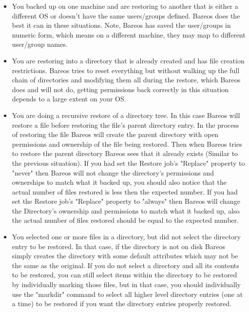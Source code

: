 \begin{itemize}
\item You backed up on one machine and are restoring to another that is
   either a different OS or doesn't have the same users/groups defined.  Bareos
   does the best it can in these situations. Note, Bareos has saved the
   user/groups in numeric form, which means on a different machine, they
   may map to different user/group names.

\item You are restoring into a directory that is already created and has
   file creation restrictions.  Bareos tries to reset everything but
   without walking up the full chain of directories and modifying them all
   during the restore, which Bareos does and will not do, getting
   permissions back correctly in this situation depends to a large extent
   on your OS.

\item You are doing a recursive restore of a directory tree.  In this case
   Bareos will restore a file before restoring the file's parent directory
   entry.  In the process of restoring the file Bareos will create the
   parent directory with open permissions and ownership of the file being
   restored.  Then when Bareos tries to restore the parent directory Bareos
   sees that it already exists (Similar to the previous situation).  If you
   had set the Restore job's "Replace" property to "never" then Bareos will
   not change the directory's permissions and ownerships to match what it
   backed up, you should also notice that the actual number of files
   restored is less then the expected number.  If you had set the Restore
   job's "Replace" property to "always" then Bareos will change the
   Directory's ownership and permissions to match what it backed up, also
   the actual number of files restored should be equal to the expected
   number.

\item You selected one or more files in a directory, but did not select the
   directory entry to be restored.  In that case, if the directory is not
   on disk Bareos simply creates the directory with some default attributes
   which may not be the same as the original.  If you do not select a
   directory and all its contents to be restored, you can still select
   items within the directory to be restored by individually marking those
   files, but in that case, you should individually use the "markdir"
   command to select all higher level directory entries (one at a time) to
   be restored if you want the directory entries properly restored.

\end{itemize}

